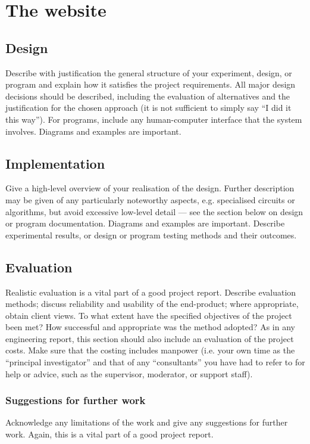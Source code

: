 \chapter{The website}

\section{Design}

Describe with justification the general structure of your experiment,
design, or program and explain how it satisfies the project
requirements. All major design decisions should be described,
including the evaluation of alternatives and the justification for the
chosen approach (it is not sufficient to simply say “I did it this
way”). For programs, include any human-computer interface that the
system involves. Diagrams and examples are important.

\section{Implementation}

Give a high-level overview of your realisation of the design. Further
description may be given of any particularly noteworthy aspects,
e.g. specialised circuits or algorithms, but avoid excessive low-level
detail — see the section below on design or program
documentation. Diagrams and examples are important. Describe
experimental results, or design or program testing methods and their
outcomes.

\section{Evaluation}

Realistic evaluation is a vital part of a good project
report. Describe evaluation methods; discuss reliability and usability
of the end-product; where appropriate, obtain client views.  To what
extent have the specified objectives of the project been met? How
successful and appropriate was the method adopted?  As in any
engineering report, this section should also include an evaluation of
the project costs.  Make sure that the costing includes manpower
(i.e. your own time as the “principal investigator” and that of any
“consultants” you have had to refer to for help or advice, such as the
supervisor, moderator, or support staff).

\subsection{Suggestions for further work}

Acknowledge any limitations of the work and give any suggestions for
further work. Again, this is a vital part of a good project report.
